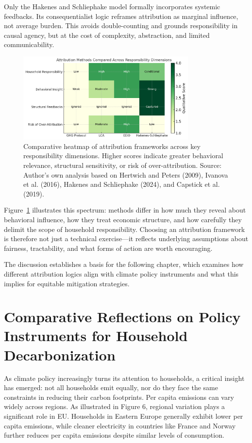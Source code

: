 \documentclass[12pt,a4paper]{article}%
\begin{document}
Only the Hakenes and Schliephake model formally incorporates systemic feedbacks. Its consequentialist logic reframes attribution as marginal influence, not average burden. This avoids double-counting and grounds responsibility in causal agency, but at the cost of complexity, abstraction, and limited communicability.
\begin{figure}[h]
    \centering
    \includegraphics[width=0.8\textwidth]{Heatmap Res.png}
    \caption{\small{Comparative heatmap of attribution frameworks across key responsibility dimensions. Higher scores indicate greater behavioral relevance, structural sensitivity, or risk of over-attribution. Source: Author's own analysis based on Hertwich and Peters (2009), Ivanova et al. (2016), Hakenes and Schliephake (2024), and Capstick et al. (2019).}}\label{fig:heatmap}
\end{figure}
Figure~\ref{fig:heatmap} illustrates this spectrum: methods differ in how much they reveal about behavioral influence, how they treat economic structure, and how carefully they delimit the scope of household responsibility. Choosing an attribution framework is therefore not just a technical exercise—it reflects underlying assumptions about fairness, tractability, and what forms of action are worth encouraging.



\noindent
The discussion establishes a basis for the following chapter, which examines how different attribution logics align with climate policy instruments and what this implies for equitable mitigation strategies.
\section{Comparative Reflections on Policy Instruments for Household Decarbonization}

As climate policy increasingly turns its attention to households, a critical insight has emerged: not all households emit equally, nor do they face the same constraints in reducing their carbon footprints. Per capita emissions can vary widely across regions. As illustrated in Figure 6, regional variation plays a significant role in EU. Households in Eastern Europe generally exhibit lower per capita emissions, while cleaner electricity in countries like France and Norway further reduces per capita emissions despite similar levels of consumption.
\end{document}
